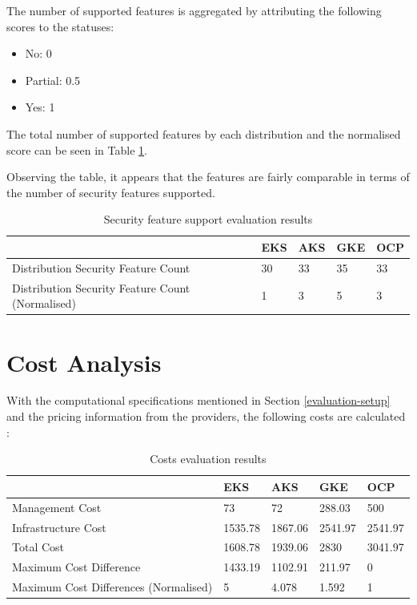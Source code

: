 The number of supported features is aggregated by attributing the following scores to the statuses:


\begin{itemize}
\tightlist
\item
  No: 0
\item
  Partial: 0.5
\item
  Yes: 1
\end{itemize}



The total number of supported features by each distribution and the normalised score can be seen in Table \ref{tab:security-evaluation}.

Observing the table, it appears that the features are fairly comparable in terms of the number of security features supported.

\begin{table}[!ht]
    \centering
    \begin{tabular}{|p{4cm}|p{2cm}|p{2cm}|p{2cm}|p{2cm}|} %
    \hline
         & EKS & AKS & GKE & OCP \\ \hline
        Distribution Security Feature Count& 30& 33& 35& 33\\ \hline
 Distribution Security Feature Count (Normalised)& 1& 3& 5&3\\\hline
    \end{tabular}
    \caption{Security feature support evaluation results} 
    \label{tab:security-evaluation}
\end{table}

\section{Cost Analysis}

With the computational specifications mentioned in Section \ref{evaluation-setup} and the pricing information from the providers, the following costs are calculated \cite{CreateEstimateConfigure,PricingAzureKubernetes,GoogleCloudPricing,RedHatOpenShiftd}:
\begin{table}[!ht]
    \centering
    \begin{tabular}{|p{4cm}|p{2cm}|p{2cm}|p{2cm}|p{2cm}|} %
    \hline
         & EKS & AKS & GKE & OCP \\ \hline
        Management Cost & 73 & 72 & 288.03 & 500 \\ \hline
        Infrastructure Cost & 1535.78 & 1867.06 & 2541.97 & 2541.97 \\ \hline
        Total Cost & 1608.78 & 1939.06 & 2830 & 3041.97 \\ \hline
        Maximum Cost Difference & 1433.19 & 1102.91 & 211.97 & 0 \\ \hline
        Maximum Cost Differences (Normalised) & 5 & 4.078 & 1.592 & 1 \\ \hline
    \end{tabular}
    \caption{Costs evaluation results} 
    \label{tab:cost-analysis}
\end{table}


